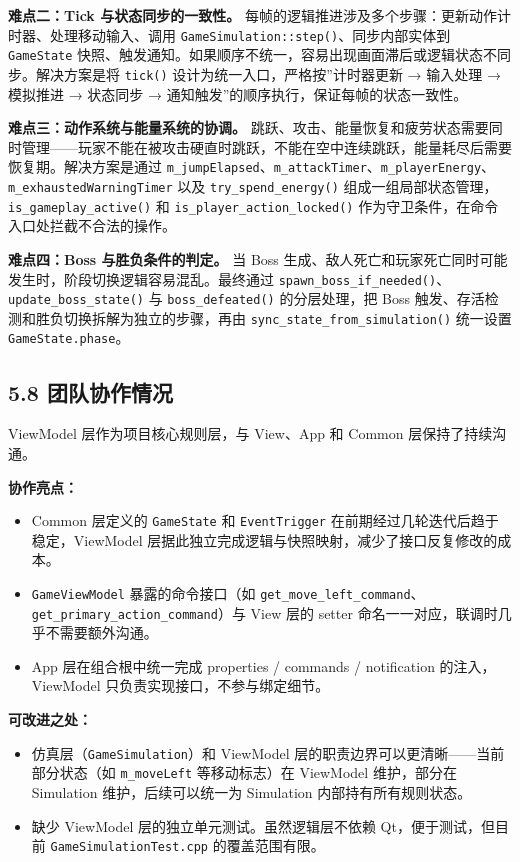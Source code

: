 \documentclass[12pt,fontset=none]{ctexart}
\begin{document}
\textbf{难点二：Tick 与状态同步的一致性。} 每帧的逻辑推进涉及多个步骤：更新动作计时器、处理移动输入、调用 \texttt{GameSimulation::step()}、同步内部实体到 \texttt{GameState} 快照、触发通知。如果顺序不统一，容易出现画面滞后或逻辑状态不同步。解决方案是将 \texttt{tick()} 设计为统一入口，严格按”计时器更新 → 输入处理 → 模拟推进 → 状态同步 → 通知触发”的顺序执行，保证每帧的状态一致性。

\textbf{难点三：动作系统与能量系统的协调。} 跳跃、攻击、能量恢复和疲劳状态需要同时管理——玩家不能在被攻击硬直时跳跃，不能在空中连续跳跃，能量耗尽后需要恢复期。解决方案是通过 \texttt{m\_jumpElapsed}、\texttt{m\_attackTimer}、\texttt{m\_playerEnergy}、\texttt{m\_exhaustedWarningTimer} 以及 \texttt{try\_spend\_energy()} 组成一组局部状态管理，\texttt{is\_gameplay\_active()} 和 \texttt{is\_player\_action\_locked()} 作为守卫条件，在命令入口处拦截不合法的操作。

\textbf{难点四：Boss 与胜负条件的判定。} 当 Boss 生成、敌人死亡和玩家死亡同时可能发生时，阶段切换逻辑容易混乱。最终通过 \texttt{spawn\_boss\_if\_needed()}、\texttt{update\_boss\_state()} 与 \texttt{boss\_defeated()} 的分层处理，把 Boss 触发、存活检测和胜负切换拆解为独立的步骤，再由 \texttt{sync\_state\_from\_simulation()} 统一设置 \texttt{GameState.phase}。

\subsection{5.8 团队协作情况}

ViewModel 层作为项目核心规则层，与 View、App 和 Common 层保持了持续沟通。

\textbf{协作亮点：}

\begin{itemize}
\item Common 层定义的 \texttt{GameState} 和 \texttt{EventTrigger} 在前期经过几轮迭代后趋于稳定，ViewModel 层据此独立完成逻辑与快照映射，减少了接口反复修改的成本。
\item \texttt{GameViewModel} 暴露的命令接口（如 \texttt{get\_move\_left\_command}、\texttt{get\_primary\_action\_command}）与 View 层的 setter 命名一一对应，联调时几乎不需要额外沟通。
\item App 层在组合根中统一完成 properties / commands / notification 的注入，ViewModel 只负责实现接口，不参与绑定细节。
\end{itemize}

\textbf{可改进之处：}

\begin{itemize}
\item 仿真层（\texttt{GameSimulation}）和 ViewModel 层的职责边界可以更清晰——当前部分状态（如 \texttt{m\_moveLeft} 等移动标志）在 ViewModel 维护，部分在 Simulation 维护，后续可以统一为 Simulation 内部持有所有规则状态。
\item 缺少 ViewModel 层的独立单元测试。虽然逻辑层不依赖 Qt，便于测试，但目前 \texttt{GameSimulationTest.cpp} 的覆盖范围有限。
\end{itemize}
\end{document}
